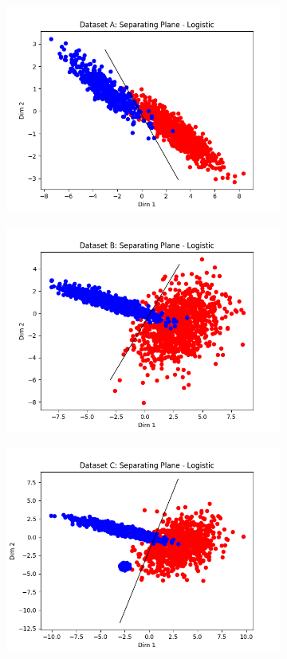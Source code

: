 \documentclass[paper=a4, fontsize=11pt]{scrartcl} %
\numberwithin{equation}{section} %
\numberwithin{figure}{section} %
\numberwithin{table}{section} %
\begin{document}
	\begin{figure}
		\begin{subfigure}{.5\textwidth}
			\centering
			\includegraphics[width=.9\linewidth]{img_A_Log.png}
		\end{subfigure}
		\begin{subfigure}{.5\textwidth}
			\centering
			\includegraphics[width=.9\linewidth]{img_B_Log.png}
		\end{subfigure}
		\begin{subfigure}{.5\textwidth}
			\centering
			\includegraphics[width=.9\linewidth]{img_C_Log.png}

\end{subfigure}
\end{figure}
\end{document}
